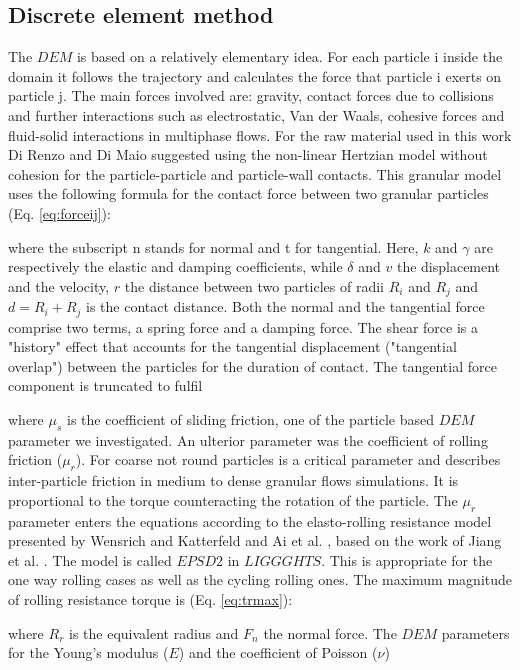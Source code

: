 \subsection{Discrete element method}
\label{subsec:dem}
The $DEM$ is based on a relatively elementary idea. 
For each particle i inside the domain it follows the trajectory and calculates the force that particle i exerts on particle j. 
The main forces involved are: gravity, contact forces due to collisions and further interactions such as electrostatic, 
Van der Waals, cohesive forces and fluid-solid interactions in multiphase flows. For the raw material used in this work 
Di Renzo and Di Maio \cite{RefWorks:145} suggested using the non-linear Hertzian model without cohesion for 
the particle-particle and particle-wall contacts. 
This granular model uses the following formula for the contact force between two granular particles (Eq. \ref{eq:forceij}):

where the subscript n stands for normal and t for tangential. 
Here, $k$ and $\gamma$ are respectively the elastic and damping coefficients, 
while $\delta$ and $v$ the displacement and the velocity, $r$ the distance
between two particles of radii $R_i$ and $R_j$ and $d = R_i + R_j $ is the
contact distance.
Both the normal and the tangential
force comprise two terms, a spring force and a damping force. 
The shear force is a "history" effect that accounts for the tangential displacement 
("tangential overlap") between the particles for the duration of contact. 
The tangential force component is truncated to fulfil 

where $\mu_s$ is the coefficient of sliding friction, one of the particle based
$DEM$ parameter we investigated. 
An ulterior parameter was the coefficient of rolling friction ($\mu_r$). 
For coarse not round particles is a critical parameter and describes inter-particle 
friction in medium to dense granular flows simulations. It is proportional to the 
torque counteracting the rotation of the particle. The $\mu_r$ parameter enters the 
equations according to the elasto-rolling resistance model presented by Wensrich and 
Katterfeld \cite{RefWorks:87} and Ai et al. \cite{RefWorks:131}, 
based on the work of Jiang et al. \cite{RefWorks:143}. 
The model is called $EPSD2$ in $LIGGGHTS$. This is appropriate for the one way
rolling cases as well as the cycling rolling ones.
The maximum magnitude of rolling resistance torque is (Eq. \ref{eq:trmax}):

where $R_r$ is the equivalent radius and $F_n$ the normal force.
The $DEM$ parameters for the Young's modulus ($E$) and the coefficient of Poisson ($\nu$) 
